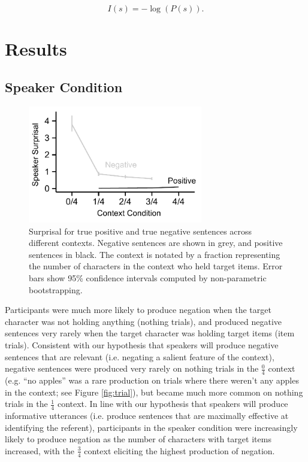 \documentclass[man, noapacite]{apa2}
\begin{document}
\begin{equation}
\label{eq:surprise}
I(s) = -\log(P(s)).
\end{equation}

\section{Results}

\subsection{Speaker Condition}

\begin{figure}[t]
\begin{center} 
\includegraphics[width=3in]{figures/surprisals_mod.pdf}
\caption{\label{fig:speakersurprise} Surprisal for true positive and true negative sentences across different contexts. Negative sentences are shown in grey, and positive sentences in black.  The context is notated by a fraction representing the number of characters in the context who held target items. Error bars show 95\% confidence intervals computed by non-parametric bootstrapping.  }
\end{center} 
\end{figure}

Participants were much more likely to produce negation when the target character was not holding anything (nothing trials), and produced negative sentences very rarely when the target character was holding target items (item trials).   Consistent with our hypothesis that speakers will produce negative sentences that are relevant (i.e. negating a salient feature of the context), negative sentences were produced very rarely on nothing trials in the $\frac{0}{4}$ context (e.g. ``no apples'' was a rare production on trials where there weren't any apples in the context; see Figure \ref{fig:trial}), but became much more common on nothing trials in the $\frac{1}{4}$ context.  In line with our hypothesis that speakers will produce informative utterances (i.e. produce sentences that are maximally effective at identifying the referent), participants in the speaker condition were increasingly likely to produce negation as the number of characters with target items increased, with the  $\frac{3}{4}$ context eliciting the highest production of negation.  
\end{document}
